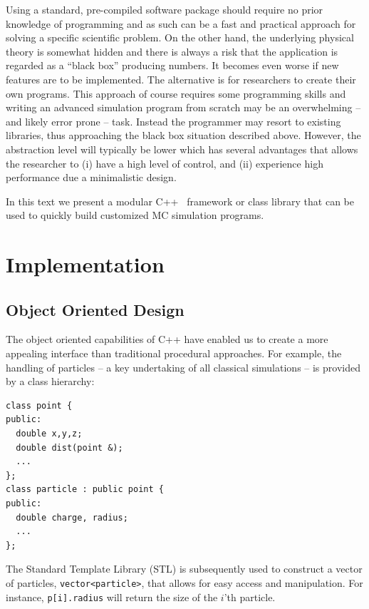 \documentclass[10pt]{bmc_article}
\newenvironment{bmcformat}{\begin{raggedright}\baselineskip20pt\sloppy\setboolean{publ}{false}}{\end{raggedright}\baselineskip20pt\sloppy}
\begin{document}
\begin{bmcformat}
Using a standard, pre-compiled software package should require no prior knowledge of programming and as such can be a fast and practical approach for solving a specific scientific problem.
On the other hand, the underlying physical theory is somewhat hidden and there is always a risk that the application is regarded as a ``black box'' producing numbers. It becomes even worse if new features are to be implemented.
The alternative is for researchers to create their own programs. This approach of course requires some programming skills and writing an advanced simulation program from scratch may be an overwhelming -- and likely error prone -- task.
Instead the programmer may resort to existing libraries, thus approaching the black box situation described above. However, the abstraction level will typically be lower which has several advantages that allows the researcher to
(i) have a high level of control, and
(ii) experience high performance due a minimalistic design.

In this text we present a modular C++~\cite{stroustrup:97} framework or class library that can be used to quickly build customized MC simulation programs.

%
\section*{Implementation}
\subsection*{Object Oriented Design}
The object oriented capabilities of C++ have enabled us to create a
more appealing interface than traditional procedural approaches.
For example, the handling of particles -- a key undertaking of all classical simulations -- is provided by a class hierarchy:
\begin{verbatim}
class point {
public:
  double x,y,z;
  double dist(point &);
  ...
};
class particle : public point {
public:
  double charge, radius;
  ...
};
\end{verbatim}
The Standard Template Library (STL) is subsequently used to construct a vector of particles, \verb"vector<particle>", that allows for easy access and manipulation.
For instance, \verb"p[i].radius" will return the size of the $i$'th particle.


\end{bmcformat}
\end{document}
